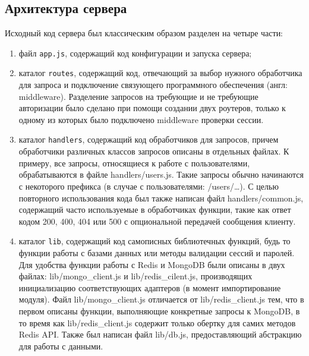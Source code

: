 \documentclass[14pt]{extarticle}
\begin{document}
\subsection{Архитектура сервера}
Исходный код сервера был классическим образом разделен на четыре части: 
\begin{enumerate}
\item файл \texttt{app.js}, содержащий код конфигурации и запуска сервера;
\item каталог \texttt{routes}, содержащий код, отвечающий за выбор нужного обработчика для запроса и подключение связующего программного обеспечения (англ: middleware). Разделение запросов на требующие и не требующие авторизации было сделано при помощи создании двух роутеров, только к одному из которых было подключено middleware проверки сессии.
\item каталог \texttt{handlers}, содержащий код обработчиков для запросов, причем обработчики различных классов запросов описаны в отдельных файлах. К примеру, все запросы, относящиеся к работе с пользователями, обрабатываются в файле handlers/users.js. Такие запросы обычно начинаются с некоторого префикса (в случае с пользователями: /users/…). С целью повторного использования кода был также написан файл handlers/common.js, содержащий часто используемые в обработчиках функции, такие как ответ кодом 200, 400, 404 или 500 с опциональной передачей сообщения клиенту.
\item каталог \texttt{lib}, содержащий код самописных библиотечных функций, будь то функции работы с базами данных или методы валидации сессий и паролей. Для удобства функции работы с Redis и MongoDB были описаны в двух файлах: lib/mongo\_client.js и lib/redis\_cilent.js, производящих инициализацию соответствующих адаптеров (в момент импортирование модуля). Файл lib/mongo\_client.js отличается от lib/redis\_client.js тем, что в первом описаны функции, выполняющие конкретные запросы к MongoDB, в то время как lib/redis\_client.js содержит только обертку для самих методов Redis API. Также был написан файл lib/db.js, предоставляющий абстракцию для работы с данными.
\end{enumerate}
\end{document}
